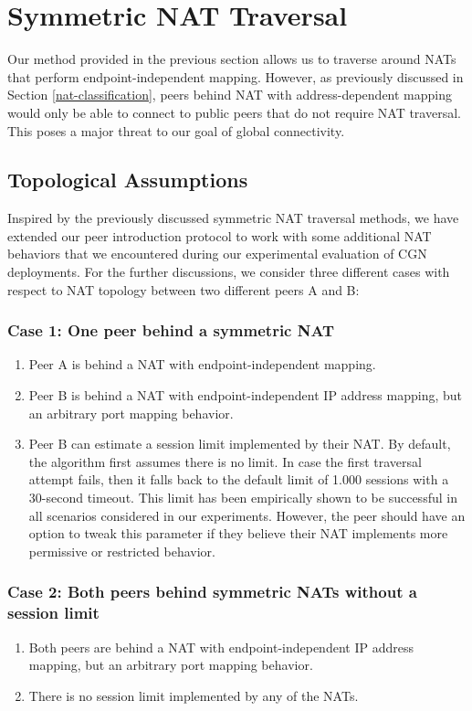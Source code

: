 \section{Symmetric NAT Traversal}
\label{symmetric-nat-traversal}

Our method provided in the previous section allows us to traverse around NATs that perform endpoint-independent mapping. However, as previously discussed in Section \ref{nat-classification}, peers behind NAT with address-dependent mapping would only be able to connect to public peers that do not require NAT traversal. This poses a major threat to our goal of global connectivity.


\subsection{Topological Assumptions}

Inspired by the previously discussed symmetric NAT traversal methods, we have extended our peer introduction protocol to work with some additional NAT behaviors that we encountered during our experimental evaluation of CGN deployments. For the further discussions, we consider three different cases with respect to NAT topology between two different peers A and B:

\subsubsection{Case 1: One peer behind a symmetric NAT}

\begin{enumerate}
    \item Peer A is behind a NAT with endpoint-independent mapping.
    \item Peer B is behind a NAT with endpoint-independent IP address mapping, but an arbitrary port mapping behavior.
    \item Peer B can estimate a session limit implemented by their NAT. By default, the algorithm first assumes there is no limit. In case the first traversal attempt fails, then it falls back to the default limit of 1.000 sessions with a 30-second timeout. This limit has been empirically shown to be successful in all scenarios considered in our experiments. However, the peer should have an option to tweak this parameter if they believe their NAT implements more permissive or restricted behavior.
\end{enumerate}

\subsubsection{Case 2: Both peers behind symmetric NATs without a session limit}
\begin{enumerate}
    \item Both peers are behind a NAT with endpoint-independent IP address mapping, but an arbitrary port mapping behavior.
    \item There is no session limit implemented by any of the NATs.
\end{enumerate}

